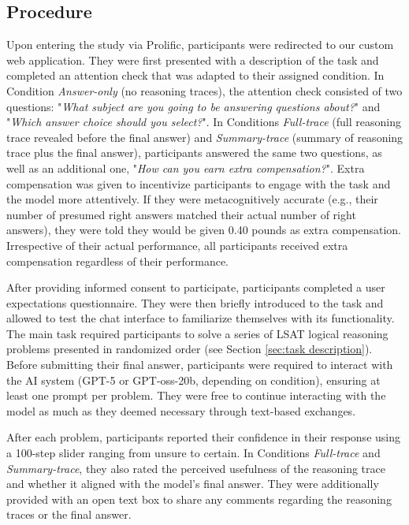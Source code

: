 \documentclass[acmlarge,review=true, anonymous=true]{acmart}
\begin{document}
\subsection{Procedure}

Upon entering the study via Prolific, participants were redirected to our custom web application. They were first presented with a description of the task and completed an attention check that was adapted to their assigned condition. In Condition \textit{Answer-only} (no reasoning traces), the attention check consisted of two questions: "\textit{What subject are you going to be answering questions about?}" and "\textit{Which answer choice should you select?}". In Conditions \textit{Full-trace} (full reasoning trace revealed before the final answer) and \textit{Summary-trace} (summary of reasoning trace plus the final answer), participants answered the same two questions, as well as an additional one, "\textit{How can you earn extra compensation?}". Extra compensation was given to incentivize participants to engage with the task and the model more attentively. If they were metacognitively accurate (e.g., their number of presumed right answers matched their actual number of right answers), they were told they would be given 0.40 pounds as extra compensation. Irrespective of their actual performance, all participants received extra compensation regardless of their performance.

After providing informed consent to participate, participants completed a user expectations questionnaire. They were then briefly introduced to the task and allowed to test the chat interface to familiarize themselves with its functionality. The main task required participants to solve a series of LSAT logical reasoning problems presented in randomized order (see Section \ref{sec:task description}). Before submitting their final answer, participants were required to interact with the AI system (GPT-5 or GPT-oss-20b, depending on condition), ensuring at least one prompt per problem. They were free to continue interacting with the model as much as they deemed necessary through text-based exchanges.

After each problem, participants reported their confidence in their response using a 100-step slider ranging from unsure to certain. In Conditions \textit{Full-trace} and \textit{Summary-trace}, they also rated the perceived usefulness of the reasoning trace and whether it aligned with the model’s final answer. They were additionally provided with an open text box to share any comments regarding the reasoning traces or the final answer.
\end{document}
